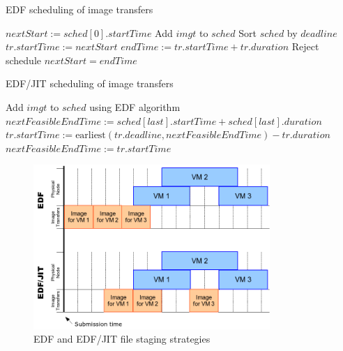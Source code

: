\begin{algorithm}
\caption{EDF scheduling of image transfers}
\label{alg:edf}
\begin{algorithmic}
\STATE
\STATE $nextStart:=sched[0].startTime$
\STATE
\STATE Add $imgt$ to $sched$
\STATE
\STATE Sort $sched$ by $deadline$
\STATE
\STATE {}
\STATE $tr.startTime:=nextStart$
\STATE $endTime:=tr.startTime+tr.duration$
\STATE Reject schedule
\ENDIF
\STATE $nextStart = endTime$
\ENDFOR
\end{algorithmic}
\end{algorithm}

\begin{algorithm}
\caption{EDF/JIT scheduling of image transfers}
\label{alg:edfjit}
\begin{algorithmic}
\STATE
\STATE Add $imgt$ to $sched$ using EDF algorithm
\STATE
\STATE {}
\STATE $nextFeasibleEndTime:=sched[last].startTime + sched[last].duration$
\STATE $tr.startTime:=\textrm{earliest}(tr.deadline, nextFeasibleEndTime) - tr.duration$
\STATE $nextFeasibleEndTime:=tr.startTime$
\ENDFOR
\end{algorithmic}
\end{algorithm}

\begin{figure}
  \begin{center}
    \includegraphics[width=0.8\textwidth]{figures/edf.png}
    \caption{EDF and EDF/JIT file staging strategies}
	\label{fig:edf}
  \end{center}
\end{figure}

